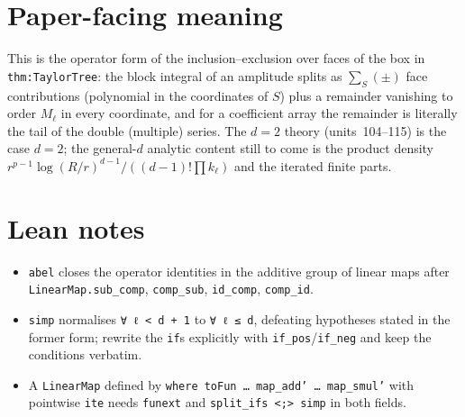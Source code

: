 \documentclass[11pt]{article}
\begin{document}
\section{Paper-facing meaning}

This is the operator form of the inclusion--exclusion over faces of the box in
\texttt{thm:TaylorTree}: the block integral of an amplitude splits as $\sum_S(\pm)$ face contributions
(polynomial in the coordinates of $S$) plus a remainder vanishing to order $M_\ell$ in every
coordinate, and for a coefficient array the remainder is literally the tail of the double (multiple)
series. The $d=2$ theory (units~104--115) is the case $d=2$; the general-$d$ analytic content still
to come is the product density $r^{p-1}\log(R/r)^{d-1}/((d-1)!\prod k_\ell)$ and the iterated
finite parts.

\section{Lean notes}

\begin{itemize}
\item \texttt{abel} closes the operator identities in the additive group of linear maps after
\texttt{LinearMap.sub\_comp}, \texttt{comp\_sub}, \texttt{id\_comp}, \texttt{comp\_id}.
\item \texttt{simp} normalises \texttt{∀ ℓ < d + 1} to \texttt{∀ ℓ ≤ d}, defeating hypotheses stated
in the former form; rewrite the \texttt{if}s explicitly with \texttt{if\_pos}/\texttt{if\_neg} and
keep the conditions verbatim.
\item A \texttt{LinearMap} defined by \texttt{where toFun … map\_add' … map\_smul'} with pointwise
\texttt{ite} needs \texttt{funext} and \texttt{split\_ifs <;> simp} in both fields.
\end{itemize}
\end{document}
